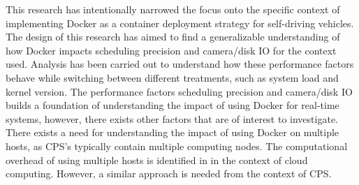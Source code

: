 This research has intentionally narrowed the focus onto the specific context of implementing Docker as a container deployment strategy for self-driving vehicles. The design of this research has aimed to find a generalizable understanding of how Docker impacts scheduling precision and camera/disk IO for the context used. Analysis has been carried out to understand how these performance factors behave while switching between different treatments, such as system load and kernel version. The performance factors scheduling precision and camera/disk IO builds a foundation of understanding the impact of using Docker for real-time systems, however, there exists other factors that are of interest to investigate. There exists a need for understanding the impact of using Docker on multiple hosts, as CPS's typically contain multiple computing nodes. The computational overhead of using multiple hosts is identified in \cite{p1} in the context of cloud computing. However, a similar approach is needed from the context of CPS.























